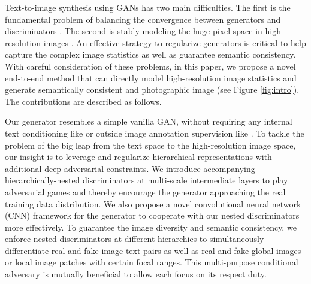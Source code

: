 \documentclass[10pt,twocolumn,letterpaper]{article}
\begin{document}
Text-to-image synthesis using GANs has two main difficulties. The first is the fundamental problem of balancing the convergence between generators and discriminators \cite{goodfellow2014generative,improvedGAN}. %
The second is stably modeling the huge pixel space in high-resolution images \cite{han2017stackgan}. 
An effective strategy to regularize generators is critical to help capture the complex image statistics \cite{huang2016stacked} as well as guarantee semantic consistency. 
With careful consideration of these problems, in this paper, we propose a novel end-to-end method that can directly model high-resolution image statistics and generate semantically consistent and photographic image (see Figure \ref{fig:intro}). The contributions are described as follows.


Our generator resembles a simple vanilla GAN, without requiring any internal text conditioning like \cite{han2017stackgan} or outside image annotation supervision like \cite{dash2017tac}. To tackle the problem of the big leap from the text space to the high-resolution image space, our insight is to leverage and regularize hierarchical representations with additional deep adversarial constraints. 
We introduce accompanying hierarchically-nested discriminators at multi-scale intermediate layers to play adversarial games and thereby encourage the generator approaching the real training data distribution. 
We also propose a novel convolutional neural network (CNN) framework for the generator to cooperate with our nested discriminators more effectively.
To guarantee the image diversity and semantic consistency,
we enforce nested discriminators at different hierarchies to simultaneously differentiate real-and-fake image-text pairs as well as real-and-fake global images or local image patches with certain focal ranges.
This multi-purpose conditional adversary is mutually beneficial to allow each focus on its respect duty. 
\end{document}
